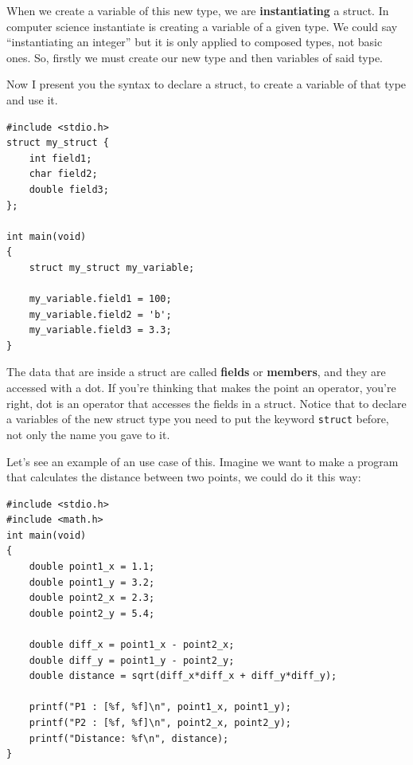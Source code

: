 \documentclass[a4paper]{article}
\begin{document}
When we create a variable of this new type, we are \textbf{instantiating} a
struct. In computer science instantiate is creating a variable of a given type.
We could say ``instantiating an integer'' but it is only applied to composed
types, not basic ones. So, firstly we must create our new type and then
variables of said type.

Now I present you the syntax to declare a struct, to create a variable
of that type and use it.

\noindent
\begin{minipage}[H]{\linewidth}
\mbox{}
\begin{lstlisting}[style=C,
caption={Declaration, instantiation and use of a \textit{struct}},
label={lst:structUse}]
#include <stdio.h>
struct my_struct {
    int field1;
    char field2;
    double field3;
};

int main(void)
{
    struct my_struct my_variable;

    my_variable.field1 = 100;
    my_variable.field2 = 'b';
    my_variable.field3 = 3.3;
}
\end{lstlisting}
\end{minipage}

The data that are inside a struct are called \textbf{fields} or
\textbf{members}, and they are
accessed with a dot. If you're thinking that makes the point an operator,
you're right, dot is an operator that accesses the fields in a struct.
Notice that to declare a variables of the new struct type you need to
put the keyword \lstinline[style=C]"struct" before, not only the name you gave
to it.

Let's see an example of an use case of this. Imagine we want to make a program
that calculates the distance between two points, we could do it this way:

\noindent
\begin{minipage}[H]{\linewidth}
\mbox{}
\begin{lstlisting}[style=C,
caption={Example of calculation of distance between points in a plane},
label={lst:pointNoStruct}]
#include <stdio.h>
#include <math.h>
int main(void)
{
    double point1_x = 1.1;
    double point1_y = 3.2;
    double point2_x = 2.3;
    double point2_y = 5.4;

    double diff_x = point1_x - point2_x;
    double diff_y = point1_y - point2_y;
    double distance = sqrt(diff_x*diff_x + diff_y*diff_y);

    printf("P1 : [%f, %f]\n", point1_x, point1_y);
    printf("P2 : [%f, %f]\n", point2_x, point2_y);
    printf("Distance: %f\n", distance);
}
\end{lstlisting}
\end{minipage}
\end{document}
